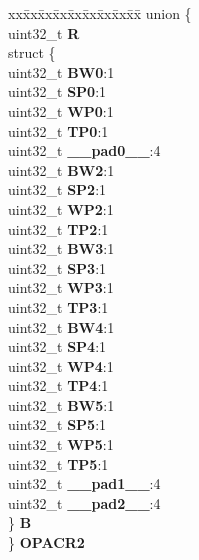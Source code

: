 \begin{DoxyCompactItemize}
\begin{tabbing}
\end{tabbing}\item 
\mbox{\label{structPBRIDGE__A__tag_ad14a75b4ee800652a9bbf2587c5b5d72}} 
\begin{tabbing}
xx\=xx\=xx\=xx\=xx\=xx\=xx\=xx\=xx\=\kill
union \{\\
\>uint32\_t {\bfseries R}\\
\>struct \{\\
\>\>uint32\_t {\bfseries BW0}:1\\
\>\>uint32\_t {\bfseries SP0}:1\\
\>\>uint32\_t {\bfseries WP0}:1\\
\>\>uint32\_t {\bfseries TP0}:1\\
\>\>uint32\_t {\bfseries \_\_pad0\_\_}:4\\
\>\>uint32\_t {\bfseries BW2}:1\\
\>\>uint32\_t {\bfseries SP2}:1\\
\>\>uint32\_t {\bfseries WP2}:1\\
\>\>uint32\_t {\bfseries TP2}:1\\
\>\>uint32\_t {\bfseries BW3}:1\\
\>\>uint32\_t {\bfseries SP3}:1\\
\>\>uint32\_t {\bfseries WP3}:1\\
\>\>uint32\_t {\bfseries TP3}:1\\
\>\>uint32\_t {\bfseries BW4}:1\\
\>\>uint32\_t {\bfseries SP4}:1\\
\>\>uint32\_t {\bfseries WP4}:1\\
\>\>uint32\_t {\bfseries TP4}:1\\
\>\>uint32\_t {\bfseries BW5}:1\\
\>\>uint32\_t {\bfseries SP5}:1\\
\>\>uint32\_t {\bfseries WP5}:1\\
\>\>uint32\_t {\bfseries TP5}:1\\
\>\>uint32\_t {\bfseries \_\_pad1\_\_}:4\\
\>\>uint32\_t {\bfseries \_\_pad2\_\_}:4\\
\>\} {\bfseries B}\\
\} {\bfseries OPACR2}\\


\end{tabbing}
\end{DoxyCompactItemize}
